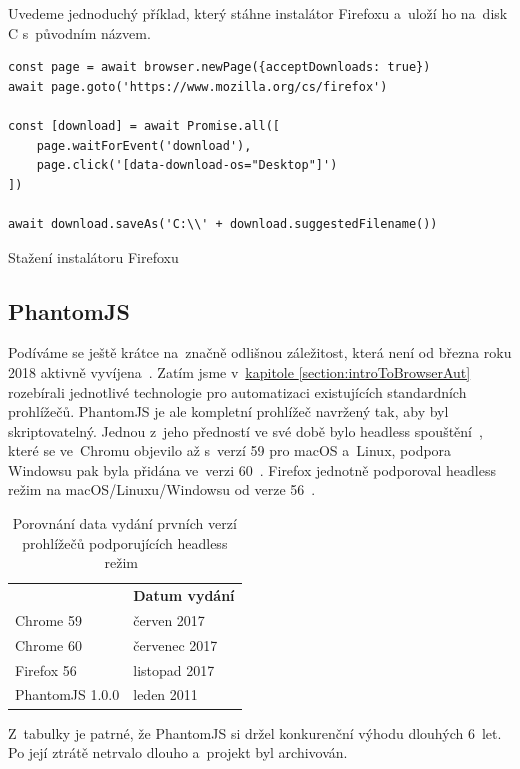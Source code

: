 \documentclass[12pt, a4paper, twoside]{article}
\newcommand{\codefigureSpacing}{1.2}
\newcommand{\refAddedText}[3]{\hyperref[#1]{#2\ref{#1}#3}}
\begin{document}
	Uvedeme jednoduchý příklad, který stáhne instalátor Firefoxu a~uloží ho na~disk C s~původním názvem.
	\begin{codefigure}[H]
	\renewcommand\baselinestretch{\codefigureSpacing}
	\begin{lstlisting}[style=MyJavaScript]
const page = await browser.newPage({acceptDownloads: true})
await page.goto('https://www.mozilla.org/cs/firefox')

const [download] = await Promise.all([
	page.waitForEvent('download'),
	page.click('[data-download-os="Desktop"]')
])

await download.saveAs('C:\\' + download.suggestedFilename())
	\end{lstlisting}
	\caption{Stažení instalátoru Firefoxu}
\end{codefigure}
	\newpage
	\subsection{PhantomJS}
	Podíváme se ještě krátce na~značně odlišnou záležitost, která není od března roku 2018 aktivně vyvíjena~\cite{phantomJsArchiving}. Zatím jsme v~\refAddedText{section:introToBrowserAut}{kapitole }{} rozebírali jednotlivé technologie pro automatizaci existujících standardních prohlížečů. PhantomJS je ale kompletní prohlížeč navržený tak, aby byl skriptovatelný. Jednou z~jeho předností ve své době bylo headless spouštění~\cite{phantomJsMainPage}, které se ve~Chromu objevilo až s~verzí 59 pro macOS a~Linux, podpora Windowsu pak byla přidána ve~verzi 60~\cite{headlessChromeGettingStarted}. Firefox jednotně podporoval headless režim na macOS/Linuxu/Windowsu od verze 56~\cite{headlessFirefox}.
	
	\begin{table}[H]
		\centering
		\begin{tabular}{ l|l } 
			\rowcolor{tableHeadingBackground}
			\multicolumn{1}{l}{\textbf{Prohlížeče}} & \multicolumn{1}{l}{\textbf{Datum vydání}} \\
			Chrome 59 & červen 2017 \\ 
			Chrome 60 & červenec 2017 \\
			Firefox 56 & listopad 2017 \\
			PhantomJS 1.0.0 & leden 2011
		\end{tabular}
		\captionsetup{justification=centering}
		\caption{Porovnání data vydání prvních verzí prohlížečů podporujících \mbox{head\-less} režim~\cite{googleChromeReleases, firefoxReleaseCalendar, phantomJsFirstRelease}}
	\end{table}
	Z~tabulky je patrné, že PhantomJS si držel konkurenční výhodu dlouhých 6~let. Po její ztrátě netrvalo dlouho a~projekt byl archivován.
	
\end{document}
